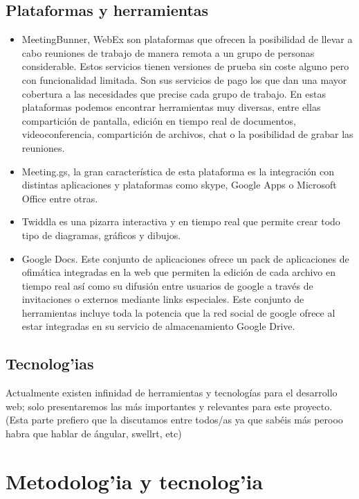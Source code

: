 \documentclass{article}
\begin{document}
	\subsection{Plataformas y herramientas}
		\begin{itemize}
			\item MeetingBunner, WebEx son plataformas que ofrecen la posibilidad de llevar a cabo reuniones de trabajo de manera remota a un grupo de personas considerable. Estos servicios tienen versiones de prueba sin coste alguno pero con funcionalidad limitada. Son sus servicios de pago los que dan una mayor cobertura a las necesidades que precise cada grupo de trabajo.
			En estas plataformas podemos encontrar herramientas muy diversas, entre ellas compartición de pantalla, edición en tiempo real de documentos, videoconferencia, compartición de archivos, chat o la posibilidad de grabar las reuniones.
			\item Meeting.gs, la gran característica de esta plataforma es la integración con distintas aplicaciones y plataformas como skype, Google Apps o Microsoft Office entre otras.
			\item Twiddla es una pizarra interactiva y en tiempo real que permite crear todo tipo de diagramas, gráficos y dibujos.
			\item Google Docs. Este conjunto de aplicaciones ofrece un pack de aplicaciones de ofimática integradas en la web que permiten la edición de cada archivo en tiempo real así como su difusión entre usuarios de google a través de invitaciones o externos mediante links especiales. Este conjunto de herramientas incluye toda la potencia que la red social de google ofrece al estar integradas en su servicio de almacenamiento Google Drive.
		\end{itemize}
	\subsection{Tecnolog'ias}
	Actualmente existen infinidad de herramientas y tecnologías para el desarrollo web; solo presentaremos las más importantes y relevantes para este proyecto.
	(Esta parte prefiero que la discutamos entre todos/as ya que sabéis más perooo habra que hablar de ángular, swellrt, etc)
\section{Metodolog'ia y tecnolog'ia}
\end{document}
